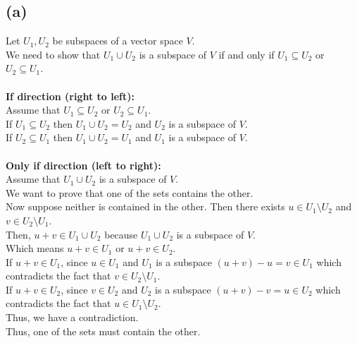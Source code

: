 \documentclass{article}
\begin{document}
\subsection*{(a)}
Let \(U_1, U_2\) be subspaces of a vector space \(V\). \\
We need to show that \(U_1 \cup U_2\) is a subspace of \(V\) if and only if \(U_1 \subseteq U_2\) or \(U_2 \subseteq U_1\). \\
\\
\textbf{If direction (right to left):} \\
Assume that \(U_1 \subseteq U_2\) or \(U_2 \subseteq U_1\). \\
If \(U_1 \subseteq U_2\) then \(U_1 \cup U_2 = U_2\) and \(U_2\) is a subspace of \(V\). \\
If \(U_2 \subseteq U_1\) then \(U_1 \cup U_2 = U_1\) and \(U_1\) is a subspace of \(V\). \\
\\
\textbf{Only if direction (left to right):} \\
Assume that \(U_1 \cup U_2\) is a subspace of \(V\). \\
We want to prove that one of the sets contains the other. \\
Now suppose neither is contained in the other. Then there exists \(u \in U_1 \setminus U_2\) and \(v \in U_2 \setminus U_1\). \\
Then, \(u + v \in U_1 \cup U_2\) because \(U_1 \cup U_2\) is a subspace of \(V\). \\
Which means \(u+v \in U_1\) or \(u+v \in U_2\). \\
If \(u + v \in U_1\), since \(u \in U_1\) and \(U_1\) is a subspace \((u+v)-u=v \in U_1\) which contradicts the fact that \(v \in U_2 \setminus U_1\). \\
If \(u + v \in U_2\), since \(v \in U_2\) and \(U_2\) is a subspace \((u+v)-v=u \in U_2\) which contradicts the fact that \(u \in U_1 \setminus U_2\). \\
Thus, we have a contradiction. \\
Thus, one of the sets must contain the other. \\
\end{document}
